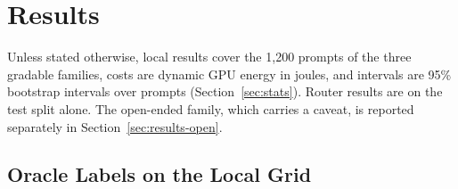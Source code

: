 \section{Results}
\label{sec:results}

Unless stated otherwise, local results cover the 1{,}200 prompts of the
three gradable families, costs are dynamic GPU energy in joules, and
intervals are 95\% bootstrap intervals over prompts
(Section~\ref{sec:stats}). Router results are on the test split alone. The
open-ended family, which carries a caveat, is reported separately in
Section~\ref{sec:results-open}.

\subsection{Oracle Labels on the Local Grid}
\label{sec:results-labels}

\begin{table}[!t]
\caption{The eight cells over the 1{,}200 gradable prompts, one sample per
prompt and cell. Accuracy counts a capped generation as a failure, and
Capped is the share of generations that reached the token cap. Tokens are
input plus output, reasoning included. Latency and energy are means per
generation; energy is dynamic board energy
(Section~\ref{sec:energy}), and J per solved divides it by accuracy.}
\label{tab:cells}
\centering
{}
\end{table}

\begin{table}[!t]
\caption{Accuracy of each cell by family, in percent, over 400 prompts per
family.}
\label{tab:family-accuracy}
\centering
{}
\end{table}

